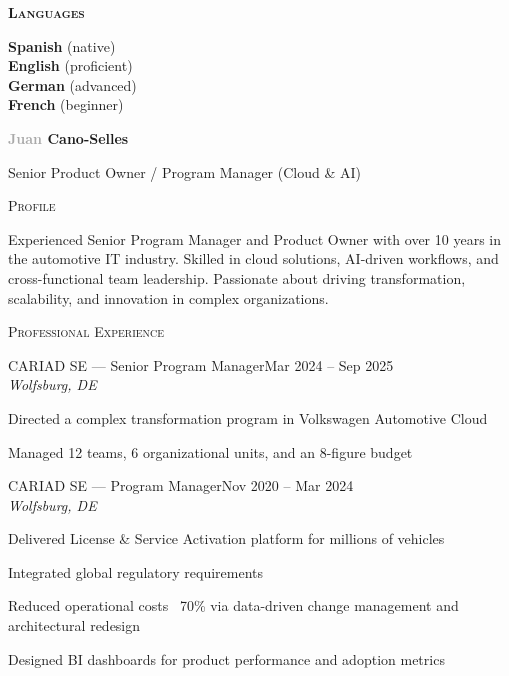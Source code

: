 \documentclass[11pt, a4paper]{article}
\newcommand{\headleft}[1]{\vspace*{2ex}\textsc{\textbf{\color{softwhite}#1}}\par%
  \vspace*{-1.2ex}{\color{softwhite}\hrulefill}\par\vspace*{0.7ex}}
\newcommand{\headright}[1]{\vspace*{2ex}\textsc{\large\color{cvblue}#1}\par%
  \vspace*{-1.4ex}{\color{cvblue}\hrulefill}\par}
\newlength{\SideBarW}
\newlength{\BetweenJobsGap}
\newlength{\RightColMargin}
\newenvironment{job}[4]{%
  \vspace{\BetweenJobsGap}%
  \noindent\textsc{\textcolor{cvblue}{#1}} {\color{darkgray}--- #2}\hfill {\small #3}\\%
  {\small\itshape #4}\par
  \begin{list}{--}{%
      \setlength{\leftmargin}{1.4em}%
      \setlength{\labelsep}{0.5em}%
      \setlength{\itemsep}{0.45ex}%
      \setlength{\topsep}{0.2ex}%
      \setlength{\rightmargin}{\RightColMargin}%
      \setlength{\listparindent}{0pt}%
      \setlength{\parsep}{0pt}%
    }%
}{\end{list}}
\begin{document}
\begin{minipage}[t][\textheight][t]{\textwidth}
{{\begin{minipage}[t]{\dimexpr\linewidth-8mm\relax}
      \headleft{Languages}
      \textbf{Spanish} (native) \\[0.5ex]
      \textbf{English} (proficient) \\[0.5ex]
      \textbf{German} (advanced) \\[0.5ex]
      \textbf{French} (beginner)
    \end{minipage}
  }%
}%
\hspace{3mm}%
\begin{minipage}[t]{\dimexpr\textwidth-\SideBarW-3mm\relax}
  \setlength{\parskip}{0.8ex}
  \setlength{\leftskip}{4mm}
  \setlength{\rightskip}{\RightColMargin}

  \vspace*{6mm}
  {\fontsize{28}{30}\sffont\bfseries\textcolor{darkgray}{Juan} \textcolor{cvblue}{Cano-Selles}}\par
  \vspace*{0.8ex}
  {\fontsize{15}{17}\sffont\color{darkgray} Senior Product Owner / Program Manager (Cloud \& AI)}\par
  \vspace*{2ex}

  \headright{Profile}
  Experienced Senior Program Manager and Product Owner with over 10 years in the automotive IT industry. Skilled in cloud solutions, AI-driven workflows, and cross-functional team leadership. Passionate about driving transformation, scalability, and innovation in complex organizations.

  \headright{Professional Experience}

  \begin{job}{CARIAD SE}{Senior Program Manager}{Mar 2024 -- Sep 2025}{Wolfsburg, DE}
    \item Directed a complex transformation program in Volkswagen Automotive Cloud
    \item Managed 12 teams, 6 organizational units, and an 8-figure budget
  \end{job}

  \begin{job}{CARIAD SE}{Program Manager}{Nov 2020 -- Mar 2024}{Wolfsburg, DE}
    \item Delivered License \& Service Activation platform for millions of vehicles
    \item Integrated global regulatory requirements
    \item Reduced operational costs ~70\% via data-driven change management and architectural redesign
    \item Designed BI dashboards for product performance and adoption metrics
  \end{job}


\end{minipage}
\end{minipage}
\end{document}
